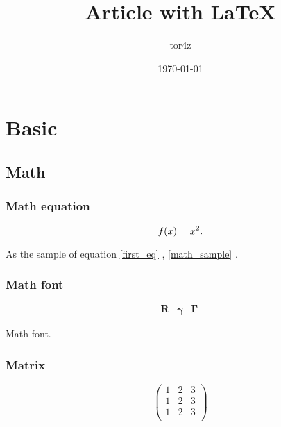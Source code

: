 \documentclass[a4paper]{book}
\begin{document}
\pagestyle{empty}
\title{Article with \LaTeX}
\author{tor4z}
\date{\today}
\maketitle

\pagestyle{empty}
\tableofcontents


\chapter{Basic}
\pagestyle{fancy}
\fancyhf{}
\fancyhead[OC]{\leftmark}
\fancyhead[EC]{\rightmark}
\cfoot{\thepage}

\section{Math}
\label{math_sample}

\subsection{Math equation}

\begin{equation}
	f(x) = x^2 \\ .
	\label{first_eq}
\end{equation}

As the sample of equation \eqref{first_eq} , \autoref{math_sample} .\\
\subsection{Math font}

\[
	\begin{array}{ccc}
		\mathbf{R}	& \mathbf{\gamma} & \mathbf{\Gamma}
	\end{array}\
\]

Math font.
\subsection{Matrix}

\begin{equation}
	\begin{pmatrix}
		1 & 2 & 3 \\
		1 & 2 & 3 \\	
		1 & 2 & 3 \\
	\end{pmatrix}
	\label{math_matrix}
\end{equation}
\end{document}

